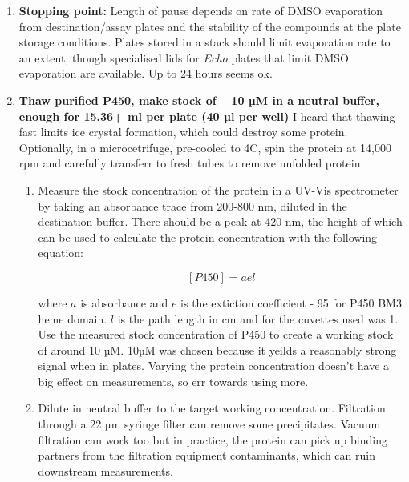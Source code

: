 \documentclass{article}
\begin{document}
\begin{enumerate}
	\item \textbf{Stopping point:} Length of pause depends on rate of DMSO evaporation from destination/assay plates and the stability of the compounds at the plate storage conditions. 
		Plates stored in a stack should limit evaporation rate to an extent, though specialised lids for \textit{Echo} plates that limit DMSO evaporation are available.
Up to 24 hours seems ok.

\item \textbf{Thaw purified P450, make stock of ~ 10 µM in a neutral buffer, enough for 15.36+ ml per plate (40 µl per well)}
I heard that thawing fast limits ice crystal formation, which could destroy some protein.
Optionally, in a microcetrifuge, pre-cooled to 4C, spin the protein at 14,000 rpm and carefully transferr to fresh tubes to remove unfolded protein.
	\begin{enumerate}

	\item Measure the stock concentration of the protein in a UV-Vis spectrometer by taking an absorbance trace from 200-800 nm, diluted in the destination buffer.
	There should be a peak at 420 nm, the height of which can be used to calculate the protein concentration with the following equation:

	$$ [P450]  = a e l  $$

       where $a$ is absorbance and $e$ is the extiction coefficient - 95 for P450 BM3 heme domain.
       $l$ is the path length in cm and for the cuvettes used was 1.
       Use the measured stock concentration of P450 to create a working stock of around 10 µM.
       10µM was chosen because it yeilds a reasonably strong signal when in plates.
       Varying the protein concentration doesn't have a big effect on measurements, so err towards using more.


	\item Dilute in neutral buffer to the target working concentration.
	Filtration through a 22 µm syringe filter can remove some precipitates.
	Vacuum filtration can work too but in practice, the protein can pick up binding partners from the filtration equipment contaminants, which can ruin downstream measurements.
	\end{enumerate}


\end{enumerate}
\end{document}
